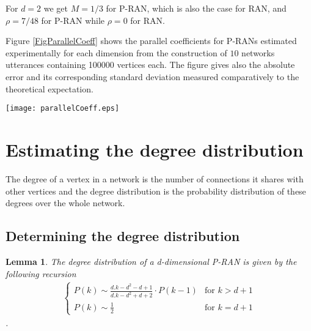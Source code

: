 \documentclass[11pt]{iopart}
\newtheorem{lemma}[theorem]{Lemma}
\begin{document}
For $d=2$ we get $M=1/3$ for P-RAN, which is also the case for RAN, and $\rho=7/48$ for P-RAN while $\rho=0$ for RAN. 

Figure \ref{FigParallelCoeff} shows the parallel coefficients for P-RANs estimated experimentally for each dimension from the construction of  $10$ networks utterances containing 100000 vertices each. The figure gives also the absolute error and its corresponding standard deviation measured comparatively to the theoretical expectation.

\begin{figure*}[htbp]
\centering
\texttt{[image: parallelCoeff.eps]}
\caption{Parallel coefficient of a P-RAN as a function of the dimension. Error and standard deviation to theory are given on the right vertical axis.}
\label{FigParallelCoeff}
\end{figure*}

\section{Estimating the degree distribution}

The degree of a vertex in a network is the number of connections it shares with other vertices and the degree distribution is the probability distribution of these degrees over the whole network.

\subsection{Determining the degree distribution}

\begin{lemma}
The degree distribution of a d-dimensional P-RAN is given by the following recursion
\begin{eqnarray}
\label{degreeDistribution}
  \left\{
   \begin{array}{ll}
     P(k) \sim \frac{d.k-d^2-d+1}{d.k-d^2+d+2} \cdot P(k-1) & \mbox{for } k > d+1\\
     P(k) \sim \frac{1}{2}  & \mbox{for } k=d+1
   \end{array}
   \right.
\end{eqnarray}.
\end{lemma}
\end{document}
